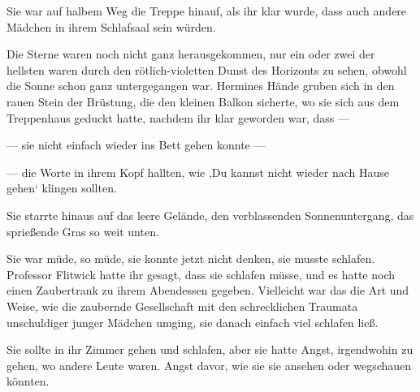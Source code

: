 Sie war auf halbem Weg die Treppe hinauf, als ihr klar wurde, dass auch andere Mädchen in ihrem Schlafsaal sein würden.

\later

Die Sterne waren noch nicht ganz herausgekommen, nur ein oder zwei der hellsten waren durch den rötlich-violetten Dunst des Horizonts zu sehen, obwohl die Sonne schon ganz untergegangen war.
%
Hermines Hände gruben sich in den rauen Stein der Brüstung, die den kleinen Balkon sicherte, wo sie sich aus dem Treppenhaus geduckt hatte, nachdem ihr klar geworden war, dass —

— sie nicht einfach wieder ins Bett gehen konnte —

— die Worte in ihrem Kopf hallten, wie ‚Du kannst nicht wieder nach Hause gehen‘ klingen sollten.

Sie starrte hinaus auf das leere Gelände, den verblassenden Sonnenuntergang, das sprießende Gras so weit unten.

Sie war müde, so müde, sie konnte jetzt nicht denken, sie musste schlafen. Professor Flitwick hatte ihr gesagt, dass sie schlafen müsse, und es hatte noch einen Zaubertrank zu ihrem Abendessen gegeben.
Vielleicht war das die Art und Weise, wie die zaubernde Gesellschaft mit den schrecklichen Traumata unschuldiger junger Mädchen umging, sie danach einfach viel schlafen ließ.

Sie sollte in ihr Zimmer gehen und schlafen, aber sie hatte Angst, irgendwohin zu gehen, wo andere Leute waren. Angst davor, wie sie sie ansehen oder wegschauen könnten.

